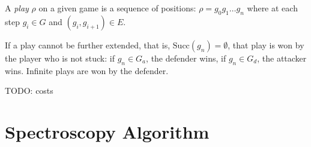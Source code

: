 \begin{definition}
    A \emph{play} $\rho$ on a given game is a sequence of positions:
    $\rho = g_0g_1 \ldots g_n$ where at each step
    $g_i \in G$ and $(g_i, g_{i+1}) \in E$.

    If a play cannot be further extended, that is,
    $\mathrm{Succ}(g_n) = \emptyset$,
    that play is won by the player who is not stuck:
    if $g_n \in G_a$, the defender wins, if $g_n \in G_d$, the attacker wins.
    Infinite plays are won by the defender.

    \scriptsize{TODO: costs}
\end{definition}


\section{Spectroscopy Algorithm}

